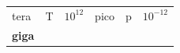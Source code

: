 {\begin{center}
\begin{xtabular*}{\mytablewidth}[t]{|p{10\mystarwidth}|p{10\mystarwidth}|p{10\mystarwidth}|p{10\mystarwidth}|p{10\mystarwidth}|p{10\mystarwidth}|}
    
        tera &
    
    
        T &
    
    
        
                \begin{math}{10}^{12}\end{math}
               &
    
    
        pico &
    
    
        p &
    
    
        
                \begin{math}{10}^{-12}\end{math}
     \tabularnewline{}
    
    
        
                \textbf{giga}
               &
    
    

\end{xtabular*}
\end{center}}
